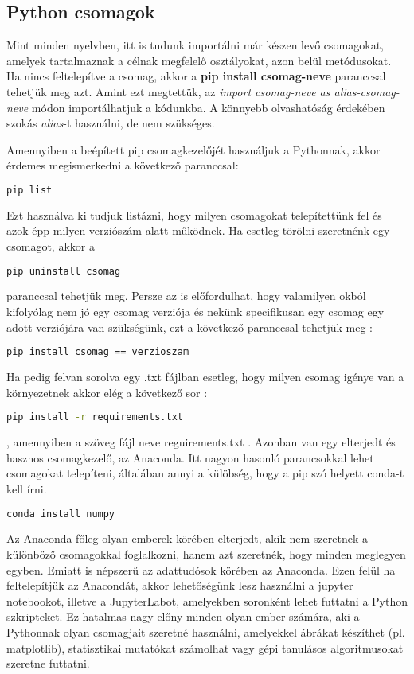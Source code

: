\documentclass{article}
\theoremstyle{definition}
\theoremstyle{theorem}
\begin{document}
\subsection{Python csomagok}
Mint minden nyelvben, itt is tudunk importálni már készen levő csomagokat, amelyek tartalmaznak a célnak megfelelő osztályokat, azon belül metódusokat. Ha nincs feltelepítve a csomag, akkor a \textbf{pip install csomag-neve} paranccsal tehetjük meg azt.
Amint ezt megtettük, az \textit{import csomag-neve as alias-csomag-neve} módon importálhatjuk a kódunkba. A könnyebb olvashatóság érdekében szokás \textit{alias}-t használni, de nem szükséges.


Amennyiben a beépített pip csomagkezelőjét használjuk a Pythonnak, akkor érdemes megismerkedni a következő paranccsal:
\begin{lstlisting}[language=bash]
    pip list
\end{lstlisting}
Ezt használva ki tudjuk listázni, hogy milyen csomagokat telepítettünk fel és azok épp milyen verziószám alatt működnek. \newline
Ha esetleg törölni szeretnénk egy csomagot, akkor a
\begin{lstlisting}[language=bash]
    pip uninstall csomag
\end{lstlisting}paranccsal tehetjük meg. Persze az is előfordulhat, hogy valamilyen okból kifolyólag nem jó egy csomag verziója és nekünk specifikusan egy csomag egy adott verziójára van szükségünk, ezt a következő paranccsal tehetjük meg :

    \begin{lstlisting}[language=bash]
  pip install csomag == verzioszam
\end{lstlisting}
Ha pedig felvan sorolva egy .txt fájlban esetleg, hogy milyen csomag igénye van a környezetnek akkor elég a következő sor :
\begin{lstlisting}[language=bash]
pip install -r requirements.txt
\end{lstlisting}
, amennyiben a szöveg fájl neve reguirements.txt . \newline
Azonban van egy elterjedt és hasznos csomagkezelő, az Anaconda. Itt nagyon hasonló parancsokkal lehet csomagokat telepíteni, általában\cite{Anaconda} annyi a külöbség, hogy a pip szó helyett conda-t kell írni.
\begin{lstlisting}[language=bash]
conda install numpy
\end{lstlisting}
Az Anaconda főleg olyan emberek körében elterjedt, akik nem szeretnek a különböző csomagokkal foglalkozni, hanem azt szeretnék, hogy minden meglegyen egyben. Emiatt is népszerű az adattudósok körében az Anaconda. Ezen felül ha feltelepítjük az Anacondát, akkor lehetőségünk lesz használni a jupyter notebookot, illetve a JupyterLabot, amelyekben soronként lehet futtatni a Python szkripteket. Ez hatalmas nagy előny minden olyan ember számára, aki a Pythonnak olyan csomagjait szeretné használni, amelyekkel ábrákat készíthet (pl. matplotlib), statisztikai mutatókat számolhat vagy gépi tanulásos algoritmusokat szeretne futtatni.
\end{document}
